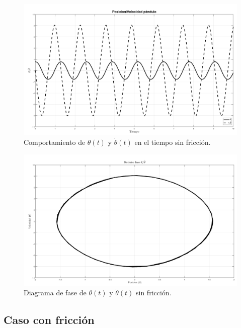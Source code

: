 \begin{figure}[hb]
 \centering 
 \includegraphics[scale=0.3]{./img/PosVelNF.png}
 \caption{Comportamiento de $\theta(t)$ y $\dot{\theta}(t)$ en el tiempo sin fricción.}
 \label{fig: time plot theta dtheta no friction}
\end{figure}

\begin{figure}[hb]
 \centering 
 \includegraphics[scale=0.3]{./img/faseNF.png}
\caption{Diagrama de fase de $\theta(t)$ y $\dot{\theta}(t)$ sin fricción.}
 \label{fig: phase plot theta no friction}
\end{figure}

\subsection{Caso con fricción}

